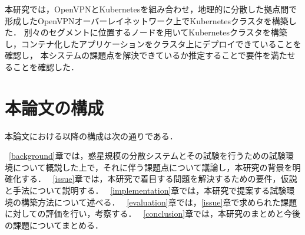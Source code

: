 本研究では，OpenVPNとKubernetesを組み合わせ，地理的に分散した拠点間で形成したOpenVPNオーバーレイネットワーク上でKubernetesクラスタを構築した．
別々のセグメントに位置するノードを用いてKubernetesクラスタを構築し，コンテナ化したアプリケーションをクラスタ上にデプロイできていることを確認し，
本システムの課題点を解決できているか推定することで要件を満たせることを確認した．

\section{本論文の構成}
\label{introduction:structure}

本論文における以降の構成は次の通りである．

~\ref{background}章では，惑星規模の分散システムとその試験を行うための試験環境について概説した上で，それに伴う課題点について議論し，本研究の背景を明確化する．
~\ref{issue}章では，本研究で着目する問題を解決するための要件，仮説と手法について説明する．
~\ref{implementation}章では，本研究で提案する試験環境の構築方法について述べる．
~\ref{evaluation}章では，\ref{issue}章で求められた課題に対しての評価を行い，考察する．
~\ref{conclusion}章では，本研究のまとめと今後の課題についてまとめる．


